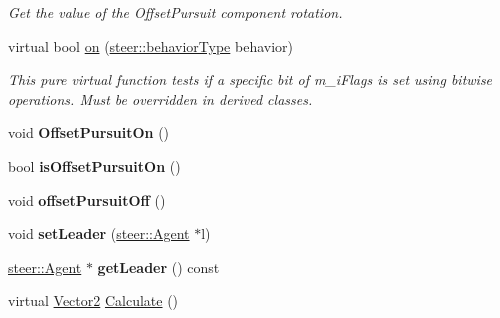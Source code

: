 \begin{DoxyCompactItemize}
\begin{DoxyCompactList}\small\item\em Get the value of the Offset\-Pursuit component rotation. \end{DoxyCompactList}\item 
virtual bool \hyperlink{classsteer_1_1_offset_pursuit_component_a748847de5cec80589b12b35214c5b5e2}{on} (\hyperlink{namespacesteer_afe6e72f8f8088962727051501181acbe}{steer\-::behavior\-Type} behavior)
\begin{DoxyCompactList}\small\item\em This pure virtual function tests if a specific bit of m\-\_\-i\-Flags is set using bitwise operations. Must be overridden in derived classes. \end{DoxyCompactList}\item 
\hypertarget{classsteer_1_1_offset_pursuit_component_ab00f431004a8582d9e92b1f5b866e960}{void {\bfseries Offset\-Pursuit\-On} ()}\label{classsteer_1_1_offset_pursuit_component_ab00f431004a8582d9e92b1f5b866e960}

\item 
\hypertarget{classsteer_1_1_offset_pursuit_component_aa637ba4d4f93d015dfa433325d18aaa4}{bool {\bfseries is\-Offset\-Pursuit\-On} ()}\label{classsteer_1_1_offset_pursuit_component_aa637ba4d4f93d015dfa433325d18aaa4}

\item 
\hypertarget{classsteer_1_1_offset_pursuit_component_af21028fac719260959481e2296e5a517}{void {\bfseries offset\-Pursuit\-Off} ()}\label{classsteer_1_1_offset_pursuit_component_af21028fac719260959481e2296e5a517}

\item 
\hypertarget{classsteer_1_1_offset_pursuit_component_a409340ab402b0c0b2df5861cc91f7749}{void {\bfseries set\-Leader} (\hyperlink{classsteer_1_1_agent}{steer\-::\-Agent} $\ast$l)}\label{classsteer_1_1_offset_pursuit_component_a409340ab402b0c0b2df5861cc91f7749}

\item 
\hypertarget{classsteer_1_1_offset_pursuit_component_a5bb14173697216a63b12edcc781b0625}{\hyperlink{classsteer_1_1_agent}{steer\-::\-Agent} $\ast$ {\bfseries get\-Leader} () const }\label{classsteer_1_1_offset_pursuit_component_a5bb14173697216a63b12edcc781b0625}

\item 
\hypertarget{classsteer_1_1_offset_pursuit_component_a7f1a09cd6bd639a433d997f2e87cc269}{virtual \hyperlink{structsteer_1_1_vector2}{Vector2} \hyperlink{classsteer_1_1_offset_pursuit_component_a7f1a09cd6bd639a433d997f2e87cc269}{Calculate} ()}\label{classsteer_1_1_offset_pursuit_component_a7f1a09cd6bd639a433d997f2e87cc269}


\end{DoxyCompactItemize}

